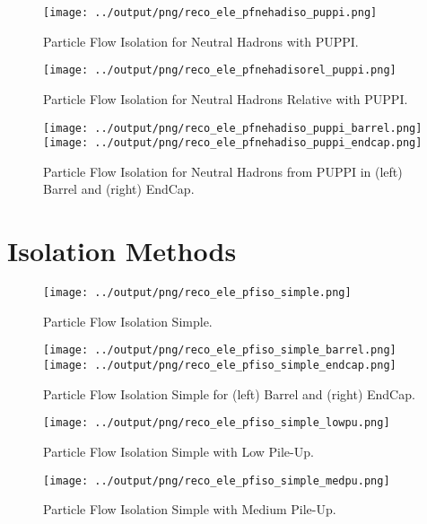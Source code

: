 \documentclass[11pt]{book}
\begin{document}
\begin{figure}[htb]
\centering
\texttt{[image: ../output/png/reco\_ele\_pfnehadiso\_puppi.png]}
\caption{Particle Flow Isolation for Neutral Hadrons with PUPPI.}
\label{fig:reco_ele_pfnehadiso_puppi}
\end{figure}

\begin{figure}[htb]
\centering
\texttt{[image: ../output/png/reco\_ele\_pfnehadisorel\_puppi.png]}
\caption{Particle Flow Isolation for Neutral Hadrons Relative with PUPPI.}
\label{fig:reco_ele_pfnehadisorel_puppi}
\end{figure}

\begin{figure}[ht]
\centering
\texttt{[image: ../output/png/reco\_ele\_pfnehadiso\_puppi\_barrel.png]}
\texttt{[image: ../output/png/reco\_ele\_pfnehadiso\_puppi\_endcap.png]}
\caption{Particle Flow Isolation for Neutral Hadrons from PUPPI in (left) Barrel and (right) EndCap.}
\label{fig:reco_ele_pfnehadiso_puppi_regions}
\end{figure}
\clearpage


\section{Isolation Methods}
\begin{figure}[ht]
\centering
\texttt{[image: ../output/png/reco\_ele\_pfiso\_simple.png]}
\caption{Particle Flow Isolation Simple.}
\label{fig:reco_ele_pfiso_simple}
\end{figure}

\begin{figure}[ht]
\centering
\texttt{[image: ../output/png/reco\_ele\_pfiso\_simple\_barrel.png]}
\texttt{[image: ../output/png/reco\_ele\_pfiso\_simple\_endcap.png]}
\caption{Particle Flow Isolation Simple for (left) Barrel and (right) EndCap.}
\label{fig:reco_ele_pfiso_simple_regions}
\end{figure}

\begin{figure}[ht]
\centering
\texttt{[image: ../output/png/reco\_ele\_pfiso\_simple\_lowpu.png]}
\caption{Particle Flow Isolation Simple with Low Pile-Up.}
\label{fig:reco_ele_pfiso_simple_lowpu}
\end{figure}

\begin{figure}[ht]
\centering
\texttt{[image: ../output/png/reco\_ele\_pfiso\_simple\_medpu.png]}
\caption{Particle Flow Isolation Simple with Medium Pile-Up.}
\label{fig:reco_ele_pfiso_simple_medpu}
\end{figure}
\end{document}
